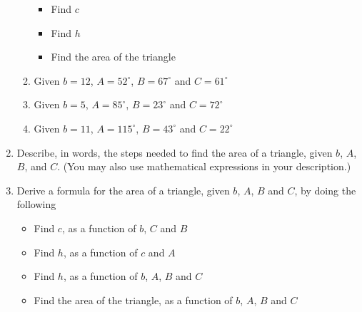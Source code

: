 \documentclass[number]{ximera}
\begin{document}
\begin{enumerate}
\begin{enumerate}
 \begin{itemize}
\item Find $c$

\item Find $h$

\item Find the area of the triangle
 
 \end{itemize}
 
 \item Given $b = 12$, $A = 52^\circ$, $B = 67^\circ$ and $C = 61^\circ$

\item Given $b = 5$, $A = 85^\circ$, $B = 23^\circ$ and $C = 72^\circ$

\item Given $b = 11$, $A = 115^\circ$, $B = 43^\circ$ and $C = 22^\circ$
 
 \end{enumerate}
 
 \item Describe, in words, the steps needed to find the area of a triangle, given $b$, $A$, $B$, and $C$. (You may also use mathematical expressions in your description.)
 
\item Derive a formula for the area of a triangle, given $b$, $A$, $B$ and $C$, by doing the following



 
  \begin{itemize}
\item Find $c$, as a function of $b$, $C$ and $B$ 

\item Find $h$, as a function of $c$ and $A$

\item Find $h$, as a function of $b$, $A$, $B$ and $C$

\item Find the area of the triangle, as a function of $b$, $A$, $B$ and $C$
 
 \end{itemize}
 

\end{enumerate}
\end{document}
